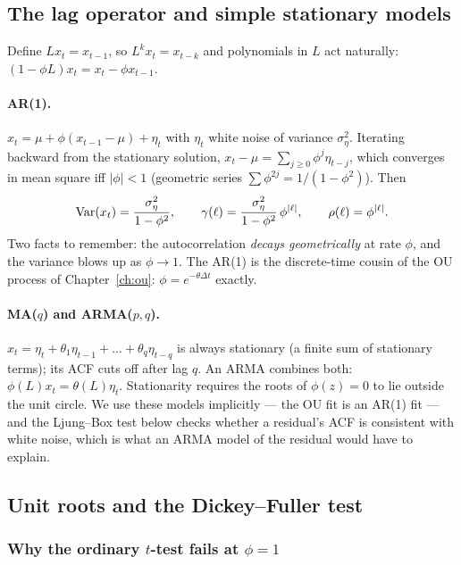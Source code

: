 \subsection{The lag operator and simple stationary models}
\label{sec:ts:arma}

Define $L x_t = x_{t-1}$, so $L^k x_t = x_{t-k}$ and polynomials in $L$ act naturally:
$(1-\phi L)x_t = x_t - \phi x_{t-1}$.

\paragraph{AR(1).} $x_t = \mu + \phi(x_{t-1}-\mu) + \eta_t$ with $\eta_t$ white noise of
variance $\sigma_\eta^2$. Iterating backward from the stationary solution,
$x_t-\mu=\sum_{j\ge0}\phi^j\eta_{t-j}$, which converges in mean square iff
$\lvert\phi\rvert<1$ (geometric series $\sum\phi^{2j}=1/(1-\phi^2)$). Then
\begin{equation}
  \operatorname{Var}(x_t)=\frac{\sigma_\eta^2}{1-\phi^2},
  \qquad
  \gamma(\ell)=\frac{\sigma_\eta^2}{1-\phi^2}\,\phi^{\lvert\ell\rvert},
  \qquad
  \rho(\ell)=\phi^{\lvert\ell\rvert}.
  \label{eq:ar1}
\end{equation}
Two facts to remember: the autocorrelation \emph{decays geometrically} at rate $\phi$,
and the variance blows up as $\phi\to1$. The AR(1) is the discrete-time cousin of the
OU process of Chapter~\ref{ch:ou}: $\phi=e^{-\theta\Delta t}$ exactly.

\paragraph{MA($q$) and ARMA($p,q$).} $x_t=\eta_t+\theta_1\eta_{t-1}+\dots+\theta_q\eta_{t-q}$
is always stationary (a finite sum of stationary terms); its ACF cuts off after lag $q$.
An ARMA combines both: $\phi(L)x_t=\theta(L)\eta_t$. Stationarity requires the roots of
$\phi(z)=0$ to lie outside the unit circle. We use these models implicitly --- the OU fit
is an AR(1) fit --- and the Ljung--Box test below checks whether a residual's ACF is
consistent with white noise, which is what an ARMA model of the residual would have to
explain.

\subsection{Unit roots and the Dickey--Fuller test}
\label{sec:ts:adf}

\subsubsection{Why the ordinary $t$-test fails at $\phi=1$}

